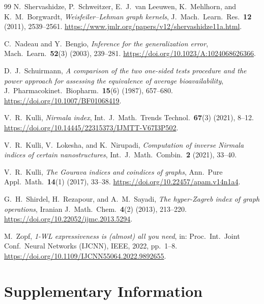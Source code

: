\documentclass[11pt,a4paper]{article}
\theoremstyle{definition}
\begin{document}
\begin{thebibliography}{99}
N.~Shervashidze, P.~Schweitzer, E.~J.~van Leeuwen, K.~Mehlhorn, and K.~M.~Borgwardt,
\emph{Weisfeiler--Lehman graph kernels},
J.~Mach.~Learn.~Res.~\textbf{12} (2011), 2539--2561.
\url{https://www.jmlr.org/papers/v12/shervashidze11a.html}.

C.~Nadeau and Y.~Bengio,
\emph{Inference for the generalization error},
Mach.~Learn.~\textbf{52}(3) (2003), 239--281.
\url{https://doi.org/10.1023/A:1024068626366}.

D.~J.~Schuirmann,
\emph{A comparison of the two one-sided tests procedure and the
power approach for assessing the equivalence of average
bioavailability},
J.~Pharmacokinet.~Biopharm.~\textbf{15}(6) (1987), 657--680.
\url{https://doi.org/10.1007/BF01068419}.

V.~R.~Kulli,
\emph{Nirmala index},
Int.~J.~Math.~Trends Technol.~\textbf{67}(3) (2021), 8--12.
\url{https://doi.org/10.14445/22315373/IJMTT-V67I3P502}.

V.~R.~Kulli, V.~Lokesha, and K.~Nirupadi,
\emph{Computation of inverse {Nirmala} indices of certain nanostructures},
Int.~J.~Math.~Combin.~\textbf{2} (2021), 33--40.

V.~R.~Kulli,
\emph{The {Gourava} indices and coindices of graphs},
Ann.~Pure Appl.~Math.~\textbf{14}(1) (2017), 33--38.
\url{https://doi.org/10.22457/apam.v14n1a4}.

G.~H.~Shirdel, H.~Rezapour, and A.~M.~Sayadi,
\emph{The hyper-{Zagreb} index of graph operations},
Iranian J.~Math.~Chem.~\textbf{4}(2) (2013), 213--220.
\url{https://doi.org/10.22052/ijmc.2013.5294}.

M.~Zopf,
\emph{1-{WL} expressiveness is (almost) all you need},
in: Proc.~Int.~Joint Conf.~Neural Networks (IJCNN), IEEE, 2022, pp.~1--8.
\url{https://doi.org/10.1109/IJCNN55064.2022.9892655}.

\end{thebibliography}

\clearpage
\setcounter{section}{0}
\setcounter{table}{0}
\setcounter{figure}{0}
\renewcommand{\thesection}{S\arabic{section}}
\renewcommand{\thetable}{S\arabic{table}}
\renewcommand{\thefigure}{S\arabic{figure}}
\section*{Supplementary Information}

\end{document}
